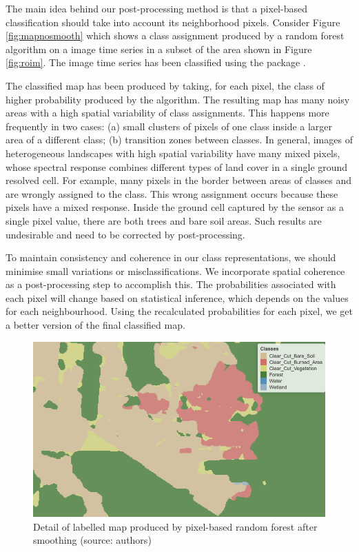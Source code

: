 \documentclass[
  shortnames]{jss}
\begin{document}
The main idea behind our post-processing method is that a pixel-based classification should take into account its neighborhood pixels. Consider Figure \ref{fig:mapnosmooth} which shows a class assignment produced by a random forest algorithm on a image time series in a subset of the area shown in Figure \ref{fig:roim}. The image time series has been classified using the  package \citep{Simoes2021}.

The classified map has been produced by taking, for each pixel, the class of higher probability produced by the algorithm. The resulting map has many noisy areas with a high spatial variability of class assignments. This happens more frequently in two cases: (a) small clusters of pixels of one class inside a larger area of a different class; (b) transition zones between classes. In general, images of heterogeneous landscapes with high spatial variability have many mixed pixels, whose spectral response combines different types of land cover in a single ground resolved cell. For example, many pixels in the border between areas of classes  and  are wrongly assigned to the  class. This wrong assignment occurs because these pixels have a mixed response. Inside the ground cell captured by the sensor as a single pixel value, there are both trees and bare soil areas. Such results are undesirable and need to be corrected by post-processing.

To maintain consistency and coherence in our class representations, we should minimise small variations or misclassifications. We incorporate spatial coherence as a post-processing step to accomplish this. The probabilities associated with each pixel will change based on statistical inference, which depends on the values for each neighbourhood. Using the recalculated probabilities for each pixel, we get a better version of the final classified map.

\begin{CodeChunk}
\begin{figure}[!h]

{\centering \includegraphics[width=0.7\linewidth]{images/map_smooth_v2} 

}

\caption[Detail of labelled map produced by pixel-based random forest after smoothing (source]{Detail of labelled map produced by pixel-based random forest after smoothing (source: authors)}\label{fig:mapsmooth}
\end{figure}
\end{CodeChunk}
\end{document}
